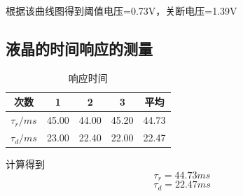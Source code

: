\documentclass{report}
\begin{document}
	
	根据该曲线图得到阈值电压=0.73V，关断电压=1.39V
	\subsection{液晶的时间响应的测量}
	\begin{table}[!h]
		\centering
		\caption{\heiti{}响应时间}
		\begin{tabular}{|c|c|c|c|c|}
			
			\hline
			次数&1&2&3&平均\\
			\hline
			$ \tau_r/ms $&45.00&44.00&45.20&44.73\\
			\hline
			$ \tau_d/ms $&23.00&22.40&22.00&22.47\\
			\hline
			
		\end{tabular}
	\end{table}
	计算得到
	\begin{equation}
		\tau_r=44.73ms \nonumber
	\end{equation}
	\begin{equation}
		\tau_d=22.47ms \nonumber
	\end{equation}
\end{document}
